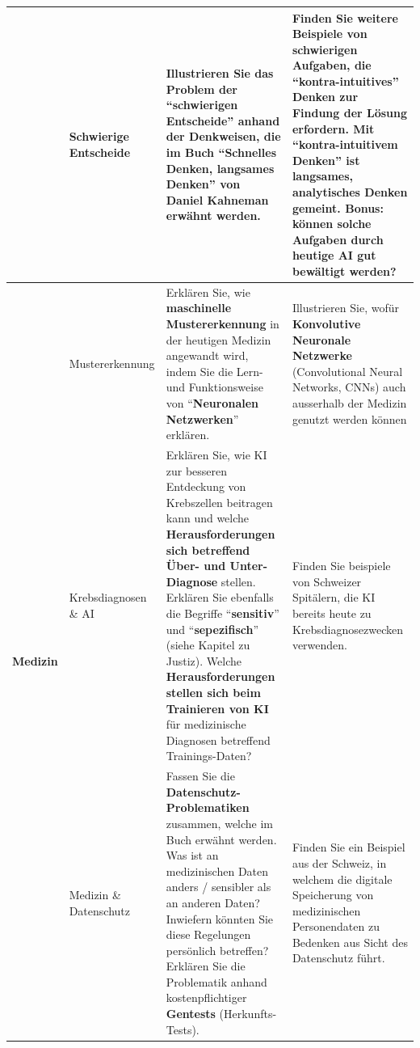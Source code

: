 \begin{landscape}
\begin{longtable}{@{}r|p{5.3cm}||p{10cm}|p{10cm}@{}}
		                              & Schwierige Entscheide                 & Illustrieren Sie das Problem der \enquote{schwierigen Entscheide} anhand der Denkweisen, die im Buch \enquote{\textbf{Schnelles Denken, langsames Denken}} von Daniel Kahneman erwähnt werden.                                                                                                                        & Finden Sie weitere Beispiele von schwierigen Aufgaben, die \enquote{kontra-intuitives} Denken zur Findung der Lösung erfordern. Mit \enquote{kontra-intuitivem Denken} ist langsames, analytisches Denken gemeint. Bonus: können solche Aufgaben durch heutige AI gut bewältigt werden?      \\\midrule\midrule
		\multirow{3}{*}{\textbf{Medizin}}      & Mustererkennung                       & Erklären Sie, wie \textbf{maschinelle Mustererkennung} in der heutigen Medizin angewandt wird, indem Sie die Lern- und Funktionsweise von \enquote{\textbf{Neuronalen Netzwerken}} erklären.                                                                                                                                                                                                         & Illustrieren Sie, wofür \textbf{Konvolutive Neuronale Netzwerke} (Convolutional Neural Networks, CNNs) auch ausserhalb der Medizin genutzt werden können                                                                                                                                  \\\cmidrule(l){2-4}
		                              & Krebsdiagnosen \& AI                  & Erklären Sie, wie KI zur besseren Entdeckung von Krebszellen beitragen kann und welche \textbf{Herausforderungen sich betreffend Über- und Unter-Diagnose} stellen. Erklären Sie ebenfalls die Begriffe \enquote{\textbf{sensitiv}} und \enquote{\textbf{sepezifisch}} (siehe Kapitel zu Justiz). Welche \textbf{Herausforderungen stellen sich beim Trainieren von KI} für medizinische Diagnosen betreffend Trainings-Daten? & Finden Sie beispiele von Schweizer Spitälern, die KI bereits heute zu Krebsdiagnosezwecken verwenden.                                                                                                                                                                            \\\cmidrule(l){2-4}
		                              & Medizin \& Datenschutz                & Fassen Sie die \textbf{Datenschutz-Problematiken} zusammen, welche im Buch erwähnt werden. Was ist an medizinischen Daten anders / sensibler als an anderen Daten? Inwiefern könnten Sie diese Regelungen persönlich betreffen?  Erklären Sie die Problematik anhand kostenpflichtiger \textbf{Gentests} (Herkunfts-Tests).                                                                   & Finden Sie ein Beispiel aus der Schweiz, in welchem die digitale Speicherung von medizinischen Personendaten zu Bedenken aus Sicht des Datenschutz führt.                                                                                                                        \\\midrule\midrule

\end{longtable}
\end{landscape}
